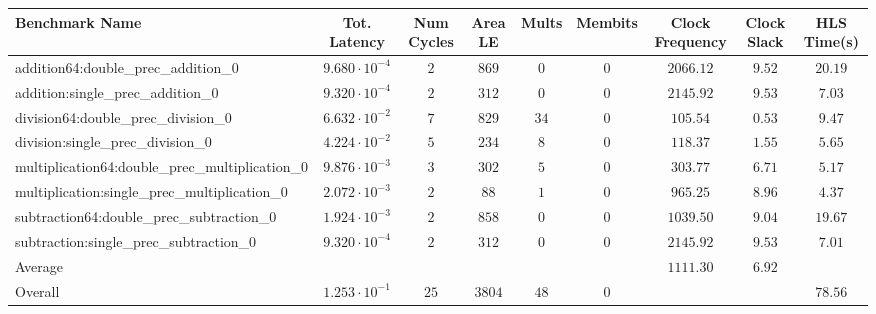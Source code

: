 \begin{tabular}{|l|c|c|c|c|c|c|c|c|}
\hline
Benchmark Name                                   & Tot. Latency            & Num Cycles & Area LE  & Mults  & Membits & Clock Frequency & Clock Slack & HLS Time(s) \\
\hline
addition64:double\_prec\_addition\_0             & $ 9.680 \cdot 10^{-4} $ & $ 2      $ & $ 869  $ & $ 0  $ & $ 0   $ & $ 2066.12     $ & $ 9.52    $ & $ 20.19   $ \\
addition:single\_prec\_addition\_0               & $ 9.320 \cdot 10^{-4} $ & $ 2      $ & $ 312  $ & $ 0  $ & $ 0   $ & $ 2145.92     $ & $ 9.53    $ & $ 7.03    $ \\
division64:double\_prec\_division\_0             & $ 6.632 \cdot 10^{-2} $ & $ 7      $ & $ 829  $ & $ 34 $ & $ 0   $ & $ 105.54      $ & $ 0.53    $ & $ 9.47    $ \\
division:single\_prec\_division\_0               & $ 4.224 \cdot 10^{-2} $ & $ 5      $ & $ 234  $ & $ 8  $ & $ 0   $ & $ 118.37      $ & $ 1.55    $ & $ 5.65    $ \\
multiplication64:double\_prec\_multiplication\_0 & $ 9.876 \cdot 10^{-3} $ & $ 3      $ & $ 302  $ & $ 5  $ & $ 0   $ & $ 303.77      $ & $ 6.71    $ & $ 5.17    $ \\
multiplication:single\_prec\_multiplication\_0   & $ 2.072 \cdot 10^{-3} $ & $ 2      $ & $ 88   $ & $ 1  $ & $ 0   $ & $ 965.25      $ & $ 8.96    $ & $ 4.37    $ \\
subtraction64:double\_prec\_subtraction\_0       & $ 1.924 \cdot 10^{-3} $ & $ 2      $ & $ 858  $ & $ 0  $ & $ 0   $ & $ 1039.50     $ & $ 9.04    $ & $ 19.67   $ \\
subtraction:single\_prec\_subtraction\_0         & $ 9.320 \cdot 10^{-4} $ & $ 2      $ & $ 312  $ & $ 0  $ & $ 0   $ & $ 2145.92     $ & $ 9.53    $ & $ 7.01    $ \\
\hline
Average                                          & $                     $ & $        $ & $      $ & $    $ & $     $ & $ 1111.30     $ & $ 6.92    $ & $         $ \\
\hline
Overall                                          & $ 1.253 \cdot 10^{-1} $ & $ 25     $ & $ 3804 $ & $ 48 $ & $ 0   $ & $             $ & $         $ & $ 78.56   $ \\
\hline
\end{tabular}
